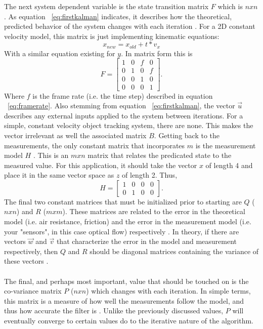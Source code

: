\documentclass[12pt]{article} %
\begin{document}
The next system dependent variable is the state transition matrix $F$ which is $nxn$. As equation ~\ref{eq:firstkalman} indicates, it describes how the theoretical, predicted behavior of the system changes with each iteration \cite{12}. For a 2D constant velocity model, this matrix is just implementing kinematic equations:
\begin{equation}
x_{new} = x_{old} + t * v_x
\end{equation}
With a similar equation existing for $y$. In matrix form this is 
\begin{equation}
F= \begin{bmatrix}
1 & 0 & f & 0 \\
0 & 1 & 0 & f \\
0 & 0 & 1 & 0 \\
0 & 0 & 0 & 1
\end{bmatrix}.
\end{equation}
Where $f$ is the frame rate (i.e. the time step) described in equation ~\ref{eq:framerate}. Also stemming from equation ~\ref{eq:firstkalman}, the vector $\vec{u}$ describes any external inputs applied to the system between iterations. For a simple, constant velocity object tracking system, there are none. This makes the vector irrelevant as well the associated matrix $B$. Getting back to the measurements, the only constant matrix that incorporates $m$ is the measurement model $H$ \cite{4}. This is an $mxn$ matrix that relates the predicated state to the measured value. For this application, it should take the vector $x$ of length 4 and place it in the same vector space as $z$ of length 2. Thus,
\begin{equation}
H = \begin{bmatrix}
1 & 0 & 0 & 0 \\
0 & 1 & 0 & 0 
\end{bmatrix}.
\end{equation}
The final two constant matrices that must be initialized prior to starting are $Q$ ($nxn$) and $R$ ($mxm$). These matrices are related to the error in the theoretical model (i.e. air resistance, friction) and the error in the measurement model (i.e. your "sensors", in this case optical flow) respectively \cite{12}. In theory, if there are vectors $\vec{w}$ and $\vec{v}$ that characterize the error in the model and measurement respectively, then $Q$ and $R$ should be diagonal matrices containing the variance of these vectors \cite{4}. \\\\
The final, and perhaps most important, value that should be touched on is the co-variance matrix $P$ ($nxn$) which changes with each iteration. In simple terms, this matrix is a measure of how well the measurements follow the model, and thus how accurate the filter is \cite{12}. Unlike the previously discussed values, $P$ will eventually converge to certain values do to the iterative nature of the algorithm.
\end{document}
